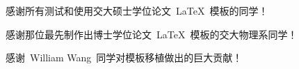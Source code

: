 
\begin{thanks}

  感谢所有测试和使用交大硕士学位论文~\LaTeX~模板的同学！

  感谢那位最先制作出博士学位论文~\LaTeX~模板的交大物理系同学！

  感谢~William Wang~同学对模板移植做出的巨大贡献！

\end{thanks}
